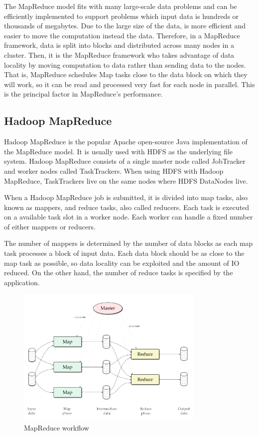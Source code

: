 The MapReduce model fits with many large-scale data problems and can be efficiently implemented to support problems which input data is hundreds or thousands of megabytes. Due to the large size of the data, is more efficient and easier to move the computation instead the data. Therefore, in a MapReduce framework, data is split into blocks and distributed across many nodes in a cluster. Then, it is the MapReduce framework who takes advantage of data locality by moving computation to data rather than sending data to the nodes. That is, MapReduce schedules Map tasks close to the data block on which they will work, so it can be read and processed very fast for each node in parallel. This is the principal factor in MapReduce's performance.

\subsection{Hadoop MapReduce}


Hadoop MapReduce \cite{ApacheHadoop} \cite{white2012hadoop} is the popular Apache open-source Java implementation of the MapReduce model. It is usually used with HDFS as the underlying file system. Hadoop MapReduce consists of a single master node called JobTracker and worker nodes called TaskTrackers. When using HDFS with Hadoop MapReduce, TaskTrackers live on the same nodes where HDFS DataNodes live.
\par
When a Hadoop MapReduce job is submitted, it is divided into map tasks, also known as mappers, and reduce tasks, also called reducers. Each task is executed on a available task slot in a worker node. Each worker can handle a fixed number of either mappers or reducers.
\par
The number of mappers is determined by the number of data blocks as each map task processes a block of input data. Each data block should be as close to the map task as possible, so data locality can be exploited and the amount of IO reduced. On the other hand, the number of reduce tasks is specified by the application.

\begin{figure}[htb]
\centering
\includegraphics[width=0.8\textwidth]{./images/mapReduceModel.png}
\caption{MapReduce workflow} \label{fig:mapreducemodel}
\end{figure}


